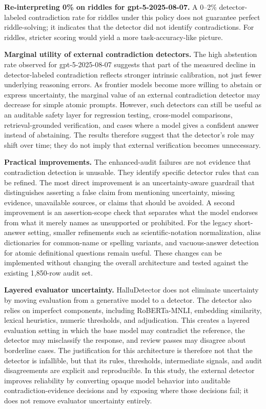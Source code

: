 \documentclass[11pt]{article}
\begin{document}
\textbf{Re-interpreting 0\% on riddles for gpt-5-2025-08-07.} A 0--2\% detector-labeled contradiction rate for riddles under this policy does not guarantee perfect riddle-solving; it indicates that the detector did not identify contradictions. For riddles, stricter scoring would yield a more task-accuracy-like picture.

\textbf{Marginal utility of external contradiction detectors.} The high abstention rate observed for gpt-5-2025-08-07 suggests that part of the measured decline in detector-labeled contradiction reflects stronger intrinsic calibration, not just fewer underlying reasoning errors. As frontier models become more willing to abstain or express uncertainty, the marginal value of an external contradiction detector may decrease for simple atomic prompts. However, such detectors can still be useful as an auditable safety layer for regression testing, cross-model comparisons, retrieval-grounded verification, and cases where a model gives a confident answer instead of abstaining. The results therefore suggest that the detector's role may shift over time; they do not imply that external verification becomes unnecessary.

\textbf{Practical improvements.} The enhanced-audit failures are not evidence that contradiction detection is unusable. They identify specific detector rules that can be refined. The most direct improvement is an uncertainty-aware guardrail that distinguishes asserting a false claim from mentioning uncertainty, missing evidence, unavailable sources, or claims that should be avoided. A second improvement is an assertion-scope check that separates what the model endorses from what it merely names as unsupported or prohibited. For the legacy short-answer setting, smaller refinements such as scientific-notation normalization, alias dictionaries for common-name or spelling variants, and vacuous-answer detection for atomic definitional questions remain useful. These changes can be implemented without changing the overall architecture and tested against the existing 1,850-row audit set.

\textbf{Layered evaluator uncertainty.} HalluDetector does not eliminate uncertainty by moving evaluation from a generative model to a detector. The detector also relies on imperfect components, including RoBERTa-MNLI, embedding similarity, lexical heuristics, numeric thresholds, and adjudication. This creates a layered evaluation setting in which the base model may contradict the reference, the detector may misclassify the response, and review passes may disagree about borderline cases. The justification for this architecture is therefore not that the detector is infallible, but that its rules, thresholds, intermediate signals, and audit disagreements are explicit and reproducible. In this study, the external detector improves reliability by converting opaque model behavior into auditable contradiction-evidence decisions and by exposing where those decisions fail; it does not remove evaluator uncertainty entirely.
\end{document}
